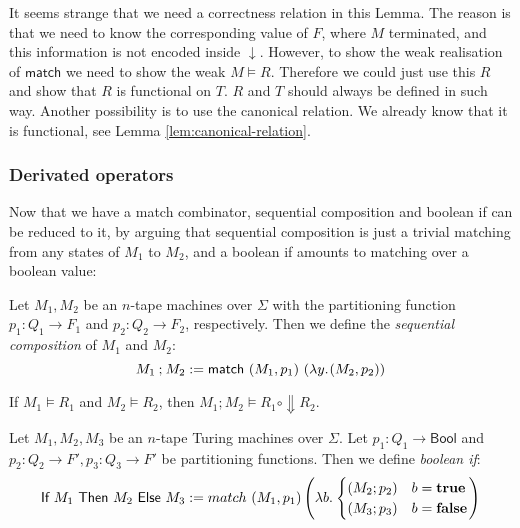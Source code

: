 \documentclass{psartcl}
\renewcommand{\vDash}{\models} \DeclareRobustCommand{\VDash}{\mathrel{|\mkern-2mu|}\joinrel \Relbar}
\newcommand{\lam}[2]{\lambda#1{.}\hskip.7pt#2}
\newcommand{\MS}[1]{\textsf{#1}}
\newcommand{\from}{:}
\renewcommand{\to}{\rightarrow}
\newcommand{\Bool}{\MS{Bool}}
\newcommand{\true}{\mathbf{true}}
\newcommand{\false}{\mathbf{false}}
\newcommand{\mseq}{\mathbin{;}}
\newcommand{\mif}[3]{\MS{If}~#1~\MS{Then}~#2~\MS{Else}~#3}
\newcommand{\mmatch}{\MS{match}}
\begin{document}
It seems strange that we need a correctness relation in this Lemma.  The reason is that we need to know the corresponding value of $F$, where $M$
terminated, and this information is not encoded inside $\downarrow$.  However, to show the weak realisation of $\MS{match}$ we need to show the weak
$M \vDash R$.  Therefore we could just use this $R$ and show that $R$ is functional on $T$.  $R$ and $T$ should always be defined in such way.
Another possibility is to use the canonical relation.  We already know that it is functional, see Lemma \ref{lem:canonical-relation}.

\subsubsection{Derivated operators}

Now that we have a match combinator, sequential composition and boolean if can be reduced to it, by arguing that sequential composition is just a
trivial matching from any states of $M_1$ to $M_2$, and a boolean if amounts to matching over a boolean value:


\begin{definition}
  \label{def:seq}
  Let $M_1, M_2$ be an $n$-tape machines over $\Sigma$ with the partitioning function $p_1 \from Q_1 \to F_1$ and $p_2 \from Q_2 \to F_2$,
  respectively.  Then we define the \emph{sequential composition} of $M_1$ and $M_2$:
  $$M_1 \mseq M_2 := \mmatch~(M_1, p_1)~(\lam y (M_2, p_2))$$
\end{definition}

\begin{corollary}
  \label{lem:seq}
  If $M_1 \vDash R_1$ and $M_2 \vDash R_2$, then $M_1 \mseq M_2 \vDash R_1 \circ \Downarrow R_2$.
\end{corollary}

\begin{definition}[Boolean if]
  \label{def:if}
  Let $M_1, M_2, M_3$ be an $n$-tape Turing machines over $\Sigma$.
  Let $p_1 \from Q_1 \to \Bool$ and $p_2 \from Q_2 \to F', p_3 \from Q_3 \to F'$ be partitioning functions.
  Then we define \emph{boolean if}:
  $$\mif{M_1}{M_2}{M_3} := match~(M_1, p_1) \left(\lam b \begin{cases} (M_2; p_2) & b = \true \\ (M_3; p_3) & b = \false \end{cases} \right)$$
\end{definition}
\end{document}
